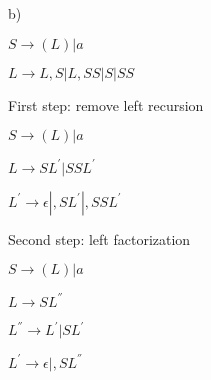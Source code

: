 

b)

$S \rightarrow (L) | a$

$L \rightarrow L,S | L,SS | S | SS$

First step: remove left recursion

$S \rightarrow (L) | a$

$L \rightarrow SL^{'} | SSL^{'}$

$L^{'} \rightarrow \epsilon | ,SL^{'} | ,SSL^{'}$

Second step: left factorization

$S \rightarrow (L) | a$

$L \rightarrow SL^{''}$

$L^{''} \rightarrow L^{'} | SL^{'}$

$L^{'} \rightarrow \epsilon | ,SL^{''}$

